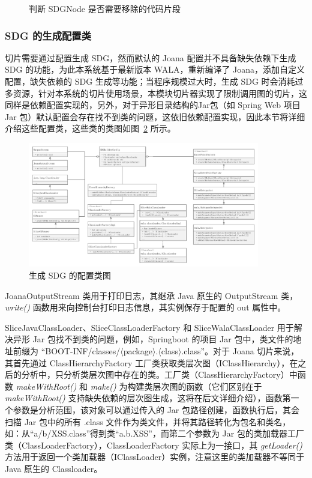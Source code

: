 \begin{figure}[!htbp]
    \centering
    \begin{minipage}{0.9\textwidth}
        
    \end{minipage}
    \caption{判断 SDGNode 是否需要移除的代码片段}\label{code:sliceJoanaRemove}
\end{figure}


\subsubsection{SDG 的生成配置类}
切片需要通过配置生成 SDG，然而默认的 Joana 配置并不具备缺失依赖下生成 SDG 的功能，为此本系统基于最新版本 WALA，重新编译了 Joana，添加自定义配置，缺失依赖的 SDG 生成等功能；当程序规模过大时，生成 SDG 时会消耗过多资源，针对本系统的切片使用场景，本模块切片器实现了限制调用图的切片，这同样是依赖配置实现的，另外，对于异形目录结构的Jar包（如 Spring Web 项目 Jar 包）默认配置会存在找不到类的问题，这依旧依赖配置实现，因此本节将详细介绍这些配置类，这些类的类图如图~\ref{JoanaConfig} 所示。

\begin{figure}[!htb]
    \centering
    \includegraphics[width=0.9\textwidth]{FIGs/chapter4/sliceConfigClass.pdf}
    \caption{生成 SDG 的配置类图}\label{JoanaConfig}
\end{figure}

JoanaOutputStream 类用于打印日志，其继承 Java 原生的 OutputStream 类， \textit{write()} 函数用来向控制台打印日志信息，其实例保存于配置的 out 属性中。

SliceJavaClassLoader、SliceClassLoaderFactory 和 SliceWalaClassLoader 用于解决异形 Jar 包找不到类的问题，例如，Springboot 的项目 Jar 包中，类文件的地址前缀为 “BOOT-INF/classes/$\langle$package$\rangle$.$\langle$class$\rangle$.class”。对于 Joana 切片来说，其首先通过 ClassHierarchyFactory 工厂类获取类层次图（IClassHierarchy），在之后的分析中，只分析类层次图中存在的类。工厂类（ClassHierarchyFactory）中函数 \textit{makeWithRoot()} 和 \textit{make()} 为构建类层次图的函数（它们区别在于 \textit{makeWithRoot()} 支持缺失依赖的层次图生成，这将在后文详细介绍），函数第一个参数是分析范围，该对象可以通过传入的 Jar 包路径创建，函数执行后，其会扫描 Jar 包中的所有 .class 文件作为类文件，并将其路径转化为包名和类名，如：从“a/b/XSS.class”得到类“a.b.XSS”，而第二个参数为 Jar 包的类加载器工厂类（ClassLoaderFactory），ClassLoaderFactory 实际上为一接口，其 \textit{getLoader()} 方法用于返回一个类加载器（IClassLoader）实例，注意这里的类加载器不等同于 Java 原生的 Classloader。

